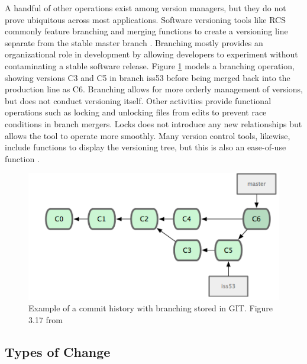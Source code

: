 A handful of other operations exist among version managers, but they do not prove ubiquitous across most applications.
Software versioning tools like RCS commonly feature branching and merging functions to create a versioning line separate from the stable master branch \cite{tichy1985rcs}.
Branching mostly provides an organizational role in development by allowing developers to experiment without contaminating a stable software release.
Figure \ref{GITTree} models a branching operation, showing versions C3 and C5 in branch iss53 before being merged back into the production line as C6.
Branching allows for more orderly management of versions, but does not conduct versioning itself.
Other activities provide functional operations such as locking and unlocking files from edits to prevent race conditions in branch mergers.
Locks does not introduce any new relationships but allows the tool to operate more smoothly.
Many version control tools, likewise, include functions to display the versioning tree, but this is also an ease-of-use function \cite{Dijkstra1994}.

\begin{figure}
	\centering
	\includegraphics[scale=0.75]{figures/GITCommitTree.png}
	\caption[Example of a commit history with branching stored in GIT.]{Example of a commit history with branching stored in GIT.  Figure 3.17 from \cite{Chacon:2009:PG:1618548}}
	\label{GITTree}
\end{figure}

\subsection{Types of Change}

